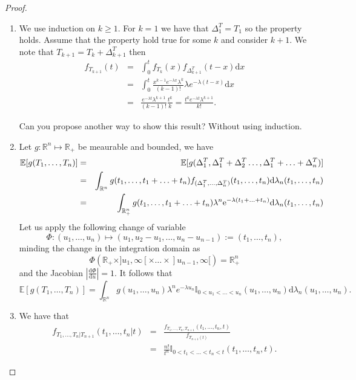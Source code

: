 \begin{proof}
\begin{enumerate}
\item We use induction on $k\geq1$. For $k=1$ we have that $\Delta^T_1= T_1$ so the property holds. Assume that the property hold true for some $k$ and consider $k+1$. We note that $T_{k+1}=T_k+\Delta^T_{k+1}$ then
\begin{eqnarray*}
f_{T_{k+1}}(t)&=&\int_{0}^{t}f_{T_k}(x)f_{\Delta^T_{k+1}}(t-x)\text{d}x\\
&=&\int_{0}^{t}\frac{x^{k-1}e^{-\lambda x}\lambda^k}{(k-1)!}\lambda e^{-\lambda(t-x)}\text{d}x\\
&=&\frac{e^{-\lambda t}\lambda^{k+1}}{(k-1)!}\frac{t^k}{k}=\frac{t^k e^{-\lambda t}\lambda^{k+1}}{k!}.
\end{eqnarray*}
\begin{exercise}
Can you propose another way to show this result? Without using induction.
\end{exercise}
\item Let $g:\mathbb{R}^n\mapsto \mathbb{R}_+$ be meaurable and bounded, we have
\begin{eqnarray*}
\mathbb{E}[g(T_{1},\ldots,T_n)]&=& \mathbb{E}[g(\Delta^T_{1},\Delta^T_1+\Delta^T_2\ldots,\Delta^T_1+\ldots+ \Delta^T_n)]\\
&=&\int_{\mathbb{R}^n}g(t_{1},\ldots,t_1+\ldots+ t_n)f_{(\Delta^T_{1},\ldots,\Delta^T_n)}(t_1,\ldots,t_n)\text{d}\lambda_n(t_{1},\ldots,t_n)\\
&=&\int_{\mathbb{R}_+^n}g(t_{1},\ldots,t_1+\ldots+ t_n)\lambda^n\mathrm{e}^{-\lambda(t_1+\ldots+t_n)}\text{d}\lambda_n(t_{1},\ldots,t_n)\\
\end{eqnarray*}
Let us apply the following change of variable 
$$
\Phi:(u_{1},\ldots,u_n)\mapsto(u_1, u_{2}-u_1,\ldots,u_n-u_{n-1}):=(t_1,\ldots, t_n),$$
minding the change in the integration domain as 
$$
\Phi(\mathbb{R}_+\times ]u_1,\infty[\times \ldots\times ]u_{n-1},\infty[) = \mathbb{R}^n_+ 
$$
and the Jacobian $\left|\frac{\text{d}\Phi}{\text{d}u}\right|=1$. It follows that
$$
\mathbb{E}[g(T_{1},\ldots,T_n)]=\int_{\mathbb{R}^n} g(u_1,\ldots, u_n)\lambda^{n}e^{-\lambda u_n}\mathbb{I}_{0<u_1<\ldots<u_n}(u_1,\ldots, u_n)\text{d}\lambda_{n}(u_1,\ldots, u_n).
$$
\item We have that 
\begin{eqnarray*}
f_{T_1,\ldots, T_n|T_{n+1}}(t_1,\ldots,t_n|t)
&=&\frac{f_{T_1,\ldots, T_n,T_{n+1}}(t_1,\ldots,t_n,t)}{f_{T_{n+1}(t)}}\\
&=&\frac{n!}{t^n}\mathbb{I}_{0<t_1<\ldots< t_n<t}(t_1,\ldots, t_n, t).
\end{eqnarray*}
\end{enumerate}
\end{proof}

